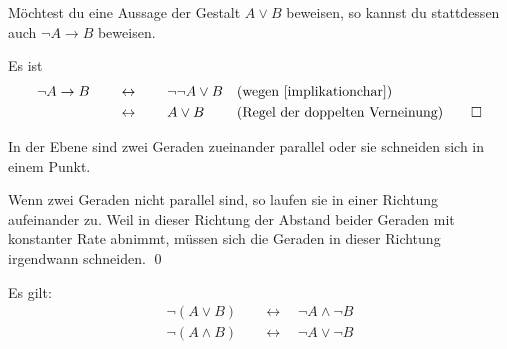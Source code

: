 \begin{satz}[*] \label{oderperimplikation}
    Möchtest du eine Aussage der Gestalt $A\lor B$ beweisen, so kannst du stattdessen auch $\neg A\to B$ beweisen.
\end{satz}


\begin{bew}
    Es ist
    \begin{align*}
        \neg A\to B \qquad &\leftrightarrow\qquad \neg\neg A\lor B && (\text{wegen \cref{implikationchar}})\\
        & \leftrightarrow\qquad A\lor B && (\text{Regel der doppelten Verneinung}) \qed
    \end{align*}
\end{bew}


\begin{bsp}[*]
    In der Ebene sind zwei Geraden zueinander parallel oder sie schneiden sich in einem Punkt.
\end{bsp}


\begin{bew}
    Wenn zwei Geraden nicht parallel sind, so laufen sie in einer Richtung aufeinander zu. Weil in dieser Richtung der Abstand beider Geraden mit konstanter Rate abnimmt, müssen sich die Geraden in dieser Richtung irgendwann schneiden. \qed
\end{bew}


\begin{satz} \label{demorgan} 
    Es gilt:
    \begin{align*}
        \neg (A\lor B) \quad& \leftrightarrow\quad \neg A\land \neg B \\
        \neg(A\land B) \quad& \leftrightarrow\quad \neg A\lor \neg B
    \end{align*}
\end{satz}


